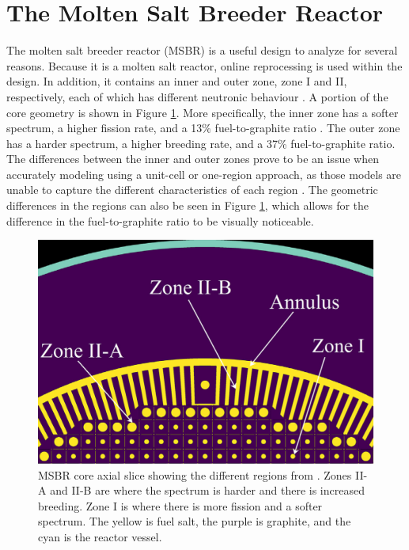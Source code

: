 

\section{The Molten Salt Breeder Reactor}

The molten salt breeder reactor (MSBR) is a useful design to analyze for several reasons. Because it is a molten salt reactor, online reprocessing is used within the design.
In addition, it contains an inner and outer zone, zone I and II, respectively, each of which has different neutronic behaviour \cite{robertson_conceptual_1971}.
A portion of the core geometry is shown in Figure \ref{fig:msbr_ryklev}.
More specifically, the inner zone has a softer spectrum, a higher fission rate, and a 13\% fuel-to-graphite ratio \cite{park_whole_2015}.
The outer zone has a harder spectrum, a higher breeding rate, and a 37\% fuel-to-graphite ratio.
The differences between the inner and outer zones prove to be an issue when accurately modeling using a unit-cell or one-region approach, as those models are unable to capture the different characteristics of each region \cite{rykhlevskii_modeling_2019}.
The geometric differences in the regions can also be seen in Figure \ref{fig:msbr_ryklev}, which allows for the difference in the fuel-to-graphite ratio to be visually noticeable.

\begin{figure}[H]
  \centering
  \includegraphics[scale=0.25]{images/msbr_ryk_1.PNG}
  \caption{MSBR core axial slice showing the different regions from \cite{rykhlevskii_modeling_2019}. Zones II-A and II-B are where the spectrum is harder and there is increased breeding. Zone I is where there is more fission and a softer spectrum. The yellow is fuel salt, the purple is graphite, and the cyan is the reactor vessel.}
   \label{fig:msbr_ryklev}
\end{figure}

